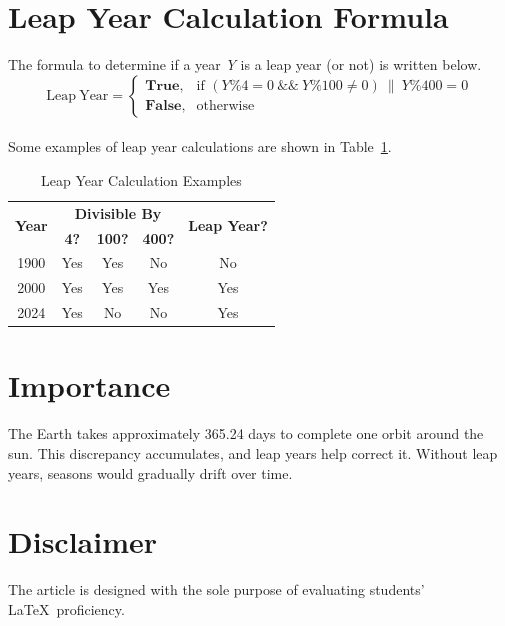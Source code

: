 \documentclass{article}
\begin{document}
\section{Leap Year Calculation Formula}
The formula to determine if a year \textit{Y} is a leap year (or not) is written below.
\begin{equation}
    \mathrm{Leap\ Year} = 
    \begin{cases}
        \textbf{True}, & \text{if } (Y \% 4 = 0 \ \&\& \ Y \% 100 \neq 0) \ \| \ Y \% 400 = 0 \\ \nonumber
        \textbf{False}, & \text{otherwise}
    \end{cases}
\end{equation}
\\
Some examples of leap year calculations are shown in Table~\ref{tab:my-table}.

\begin{table}[ht]
\centering
\begin{tabular}{|c|ccc|c|}
\hline
\multirow{2}{*}{\textbf{Year}} & \multicolumn{3}{c|}{\textbf{Divisible By}}                                            & \multirow{2}{*}{\textbf{Leap Year?}} \\ \cline{2-4}
                               & \multicolumn{1}{c|}{\textbf{4?}} & \multicolumn{1}{c|}{\textbf{100?}} & \textbf{400?} &                                      \\ \hline
1900                           & \multicolumn{1}{c|}{Yes}         & \multicolumn{1}{c|}{Yes}           & No            & No                                   \\ \hline
2000                           & \multicolumn{1}{c|}{Yes}         & \multicolumn{1}{c|}{Yes}           & Yes           & Yes                                  \\ \hline
2024                           & \multicolumn{1}{c|}{Yes}         & \multicolumn{1}{c|}{No}            & No            & Yes                                  \\ \hline
\end{tabular}
\caption{Leap Year Calculation Examples}
\label{tab:my-table}
\end{table}


\section{Importance}
The Earth takes approximately 365.24 days to complete one orbit around the sun. This discrepancy accumulates, and leap years help correct it. Without leap years, seasons would gradually drift over time.

\section*{Disclaimer}
The article is designed with the sole purpose of evaluating students' \LaTeX\ proficiency.



\end{document}
